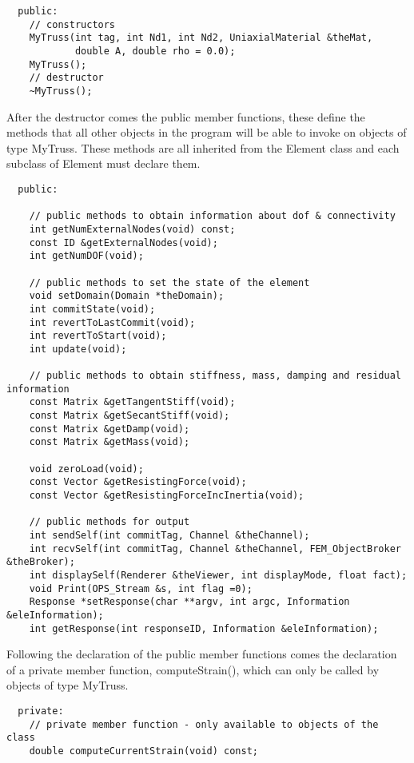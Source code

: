 \documentclass[12pt]{article}
\begin{document}
{\sf\small \begin{verbatim}
  public:
    // constructors
    MyTruss(int tag, int Nd1, int Nd2, UniaxialMaterial &theMat,
            double A, double rho = 0.0); 
    MyTruss();    
    // destructor
    ~MyTruss();
\end{verbatim} }

After the destructor comes the public member functions, these define
the methods that all other objects in the program will be able to
invoke on objects of type MyTruss. These methods are all inherited
from the Element class and each subclass of Element must declare them.

{\sf\small \begin{verbatim}
  public:

    // public methods to obtain information about dof & connectivity
    int getNumExternalNodes(void) const;
    const ID &getExternalNodes(void);
    int getNumDOF(void);

    // public methods to set the state of the element
    void setDomain(Domain *theDomain);
    int commitState(void);
    int revertToLastCommit(void);        
    int revertToStart(void);        
    int update(void);

    // public methods to obtain stiffness, mass, damping and residual information
    const Matrix &getTangentStiff(void);
    const Matrix &getSecantStiff(void);    
    const Matrix &getDamp(void);    
    const Matrix &getMass(void);    

    void zeroLoad(void);	
    const Vector &getResistingForce(void);
    const Vector &getResistingForceIncInertia(void);            

    // public methods for output
    int sendSelf(int commitTag, Channel &theChannel);
    int recvSelf(int commitTag, Channel &theChannel, FEM_ObjectBroker &theBroker);
    int displaySelf(Renderer &theViewer, int displayMode, float fact);    
    void Print(OPS_Stream &s, int flag =0);    
    Response *setResponse(char **argv, int argc, Information &eleInformation);
    int getResponse(int responseID, Information &eleInformation);
\end{verbatim} }

Following the declaration of the public member functions comes the
declaration of a private member function, {\sf computeStrain()}, which
can only be called by objects of type MyTruss.

{\sf\small \begin{verbatim}    
  private:
    // private member function - only available to objects of the class
    double computeCurrentStrain(void) const;
\end{verbatim} }
\end{document}
